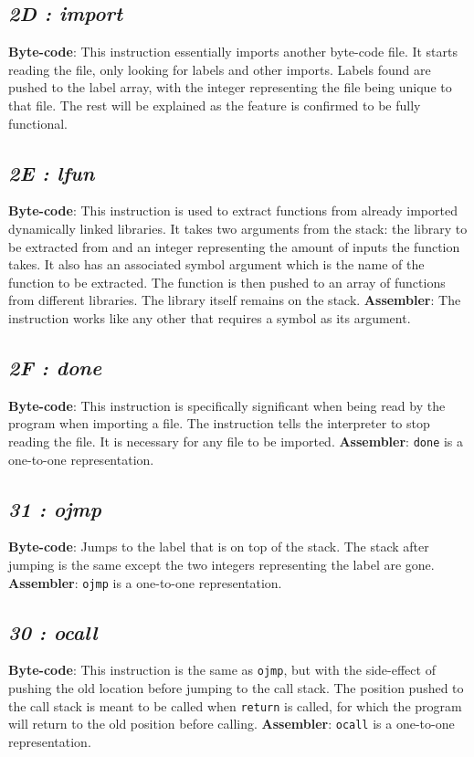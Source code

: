 \documentclass[12pt]{report}
\begin{document}
  \subsection{\emph{2D : import}}
  \textbf{Byte-code}: This instruction essentially imports another byte-code file.  It
  starts reading the file, only looking for labels and other imports.  Labels found are
  pushed to the label array, with the integer representing the file being unique to
  that file.  The rest will be explained as the feature is confirmed to be fully
  functional.
  \subsection{\emph{2E : lfun}}
  \textbf{Byte-code}: This instruction is used to extract functions from already
  imported dynamically linked libraries.  It takes two arguments from the stack:
  the library to be extracted from and an integer representing the amount of inputs
  the function takes.  It also has an associated symbol argument which is the name
  of the function to be extracted.  The function is then pushed to an array of
  functions from different libraries.  The library itself remains on the stack.
  \newline
  \textbf{Assembler}: The instruction works like any other that requires a symbol
  as its argument.
  \subsection{\emph{2F : done}}
  \textbf{Byte-code}: This instruction is specifically significant when being read
  by the program when importing a file.  The instruction tells the interpreter to
  stop reading the file.  It is necessary for any file to be imported.\newline
  \textbf{Assembler}: \verb|done| is a one-to-one representation.
  \subsection{\emph{31 : ojmp}}
  \textbf{Byte-code}: Jumps to the label that is on top of the stack.  The stack after
  jumping is the same except the two integers representing the label are gone.\newline
  \textbf{Assembler}: \verb|ojmp| is a one-to-one representation.
  \subsection{\emph{30 : ocall}}
  \textbf{Byte-code}: This instruction is the same as \verb|ojmp|, but with the
  side-effect of pushing the old location before jumping to the call stack.  The
  position pushed to the call stack is meant to be called when \verb|return| is
  called, for which the program will return to the old position before calling.
  \newline
  \textbf{Assembler}: \verb|ocall| is a one-to-one representation.
\end{document}

